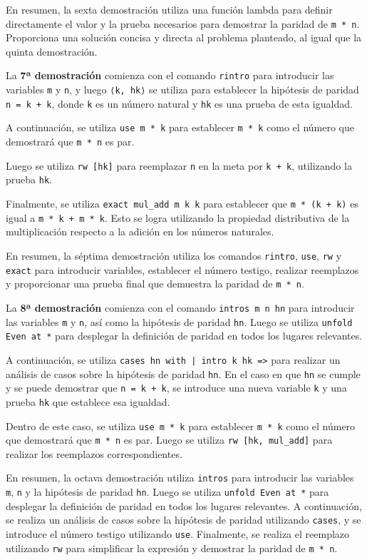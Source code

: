 En resumen, la sexta demostración utiliza una función lambda para
definir directamente el valor y la prueba necesarios para demostrar la
paridad de \texttt{m * n}. Proporciona una solución concisa y directa al
problema planteado, al igual que la quinta demostración.

La \textbf{7ª demostración} comienza con el comando \texttt{rintro} para introducir
las variables \texttt{m} y \texttt{n}, y luego \texttt{⟨k, hk⟩} se utiliza para establecer la
hipótesis de paridad \texttt{n = k + k}, donde \texttt{k} es un número natural y \texttt{hk}
es una prueba de esta igualdad.

A continuación, se utiliza \texttt{use m * k} para establecer \texttt{m * k} como el
número que demostrará que \texttt{m * n} es par.

Luego se utiliza \texttt{rw [hk]} para reemplazar \texttt{n} en la meta por \texttt{k + k},
utilizando la prueba \texttt{hk}.

Finalmente, se utiliza \texttt{exact mul\_add m k k} para establecer que
\texttt{m * (k + k)} es igual a \texttt{m * k + m * k}. Esto se logra utilizando la
propiedad distributiva de la multiplicación respecto a la adición en los
números naturales.

En resumen, la séptima demostración utiliza los comandos \texttt{rintro},
\texttt{use}, \texttt{rw} y \texttt{exact} para introducir variables, establecer el número
testigo, realizar reemplazos y proporcionar una prueba final que
demuestra la paridad de \texttt{m * n}.

La \textbf{8ª demostración} comienza con el comando \texttt{intros m n hn} para
introducir las variables \texttt{m} y \texttt{n}, así como la hipótesis de paridad
\texttt{hn}. Luego se utiliza \texttt{unfold Even at *} para desplegar la definición
de paridad en todos los lugares relevantes.

A continuación, se utiliza \texttt{cases hn with | intro k hk =>} para realizar
un análisis de casos sobre la hipótesis de paridad \texttt{hn}. En el caso en
que \texttt{hn} se cumple y se puede demostrar que \texttt{n = k + k}, se introduce
una nueva variable \texttt{k} y una prueba \texttt{hk} que establece esa igualdad.

Dentro de este caso, se utiliza \texttt{use m * k} para establecer \texttt{m * k} como
el número que demostrará que \texttt{m * n} es par. Luego se utiliza
\texttt{rw [hk, mul\_add]} para realizar los reemplazos correspondientes.

En resumen, la octava demostración utiliza \texttt{intros} para introducir las
variables \texttt{m}, \texttt{n} y la hipótesis de paridad \texttt{hn}. Luego se utiliza
\texttt{unfold Even at *} para desplegar la definición de paridad en todos los
lugares relevantes. A continuación, se realiza un análisis de casos
sobre la hipótesis de paridad utilizando \texttt{cases}, y se introduce el
número testigo utilizando \texttt{use}. Finalmente, se realiza el reemplazo
utilizando \texttt{rw} para simplificar la expresión y demostrar la paridad de
\texttt{m * n}.

